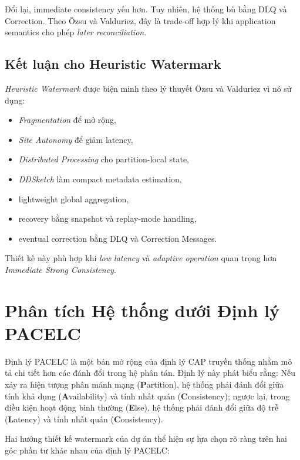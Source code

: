 \documentclass[12pt,a4paper]{article}
\begin{document}
Đổi lại, immediate consistency yếu hơn. Tuy nhiên, hệ thống bù bằng DLQ và Correction. Theo Özsu và Valduriez, đây là trade-off hợp lý khi application semantics cho phép \textit{later reconciliation}.

\subsection{Kết luận cho Heuristic Watermark}

\textit{Heuristic Watermark} được biện minh theo lý thuyết Özsu và Valduriez vì nó sử dụng:

\begin{itemize}
    \item \textit{Fragmentation} để mở rộng,
    \item \textit{Site Autonomy} để giảm latency,
    \item \textit{Distributed Processing} cho partition-local state,
    \item \textit{DDSketch} làm compact metadata estimation,
    \item lightweight global aggregation,
    \item recovery bằng snapshot và replay-mode handling,
    \item eventual correction bằng DLQ và Correction Messages.
\end{itemize}

Thiết kế này phù hợp khi \textit{low latency} và \textit{adaptive operation} quan trọng hơn \textit{Immediate Strong Consistency}.

\section{Phân tích Hệ thống dưới Định lý PACELC}

Định lý PACELC là một bản mở rộng của định lý CAP truyền thống nhằm mô tả chi tiết hơn các đánh đổi trong hệ phân tán. Định lý này phát biểu rằng: Nếu xảy ra hiện tượng phân mảnh mạng (\textbf{P}artition), hệ thống phải đánh đổi giữa tính khả dụng (\textbf{A}vailability) và tính nhất quán (\textbf{C}onsistency); ngược lại, trong điều kiện hoạt động bình thường (\textbf{E}lse), hệ thống phải đánh đổi giữa độ trễ (\textbf{L}atency) và tính nhất quán (\textbf{C}onsistency).

Hai hướng thiết kế watermark của dự án thể hiện sự lựa chọn rõ ràng trên hai góc phần tư khác nhau của định lý PACELC:
\end{document}
